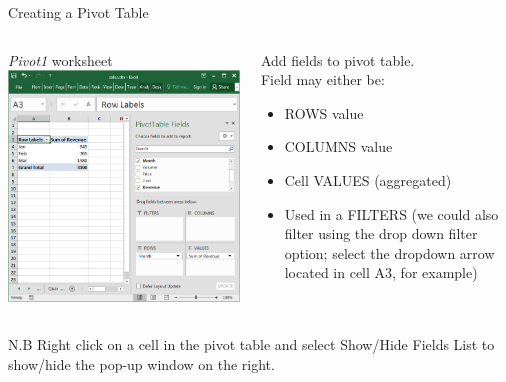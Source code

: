 \documentclass[xcolor=svgnames, handout]{beamer}
\begin{document}
\begin{frame}{Creating a Pivot Table}
\begin{columns}[T] %
\begin{column}{.48\textwidth}
\textit{Pivot1} worksheet
{\includegraphics[width=1.2\textwidth]{pivot3}}
\end{column}%
\hfill%
\begin{column}{.48\textwidth}
\vspace{1em}
Add fields to pivot table.\\[1em]
Field may either be:
\begin{itemize}
\item ROWS value
\item  COLUMNS value
\item  Cell VALUES (aggregated)
\item  Used in a FILTERS (we could also filter using the drop down filter option; select the dropdown arrow located in cell A3, for example)
\end{itemize}
\end{column}%
\end{columns}
N.B Right click on a cell in the pivot table and select Show/Hide Fields List to show/hide the pop-up window on the right.
\end{frame}
\end{document}
